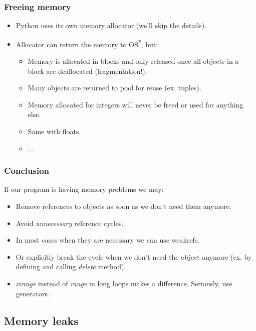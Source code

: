 \documentclass{beamer}
\begin{document}
    \begin{frame}
        \frametitle{Freeing memory}
        \begin{itemize}
            \item Python uses its own memory allocator (we'll skip the details).
            \item Allocator can return the memory to OS\textsuperscript{*}, but:
            \begin{itemize}
                \item Memory is allocated in blocks and only released once all objects in a block are deallocated (fragmentation!).
                \item Many objects are returned to pool for reuse (ex. tuples).
                \item Memory allocated for integers will never be freed or used for anything else.
                \item Same with floats.
                \item ...
            \end{itemize}
        \end{itemize}
    \end{frame}

    \begin{frame}
        \frametitle{Conclusion}
        If our program is having memory problems we may:
        \begin{itemize}
            \item Remove references to objects as soon as we don't need them anymore.
            \item Avoid \textit{unnecessary} reference cycles.
            \item In most cases when they are necessary we can use weakrefs.
            \item Or explicitly break the cycle when we don't need the object anymore (ex. by defining and calling \textit{delete} method).
            \item \textit{xrange} instead of \textit{range} in long loops makes a difference. Seriously, use generators.
        \end{itemize}
    \end{frame}

\subsection{Memory leaks}
\end{document}
